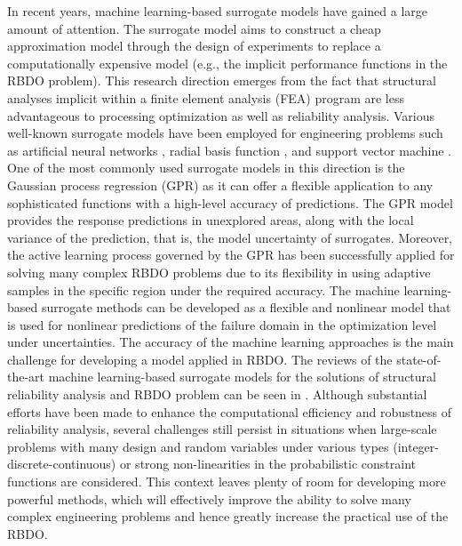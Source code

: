 \documentclass[preprint,3p]{elsarticle}
\begin{document}
\begin{linenumbers}
In recent years, machine learning-based surrogate models have gained a large amount of attention. The surrogate model aims to construct a cheap approximation model through the design of experiments to replace a computationally expensive model (e.g., the implicit performance functions in the RBDO problem). This research direction emerges from the fact that structural analyses implicit within a finite element analysis (FEA) program are less advantageous to processing optimization as well as reliability analysis. Various well-known surrogate models have been employed for engineering problems such as artificial neural networks \cite{Lehky2018, Papadrakakis2002, LI2022a}, radial basis function \cite{Jing2019, Shang2021}, and support vector machine \cite{Moustapha2019, Cheng2020, liu2017}. One of the most commonly used surrogate models in this direction is the Gaussian process regression (GPR) \cite{Yang2021, YANG2022, Ni2020, Su2017, Li2019} as it can offer a flexible application to any sophisticated functions with a high-level accuracy of predictions. The GPR model provides the response predictions in unexplored areas, along with the local variance of the prediction, that is, the model uncertainty of surrogates. Moreover, the active learning process governed by the GPR \cite{MOUSTAPHA2022, XIAO2020, WANG2024, WEI2023} has been successfully applied for solving many complex RBDO problems due to its flexibility in using adaptive samples in the specific region under the required accuracy. The machine learning-based surrogate methods can be developed as a flexible and nonlinear model that is used for nonlinear predictions of the failure domain in the optimization level under uncertainties. The accuracy of the machine learning approaches is the main challenge for developing a model applied in RBDO. The reviews of the state-of-the-art machine learning-based surrogate models for the solutions of structural reliability analysis and RBDO problem can be seen in \cite{Moustapha2019, SaraygordAfshari2022, TEIXEIRA2021, CUI2019}. Although substantial efforts have been made to enhance the computational efficiency and robustness of reliability analysis, several challenges still persist in situations when large-scale problems with many design and random variables under various types (integer-discrete-continuous) or strong non-linearities in the probabilistic constraint functions are considered. This context leaves plenty of room for developing more powerful methods, which will effectively improve the ability to solve many complex engineering problems and hence greatly increase the practical use of the RBDO. 


\end{linenumbers}
\end{document}
